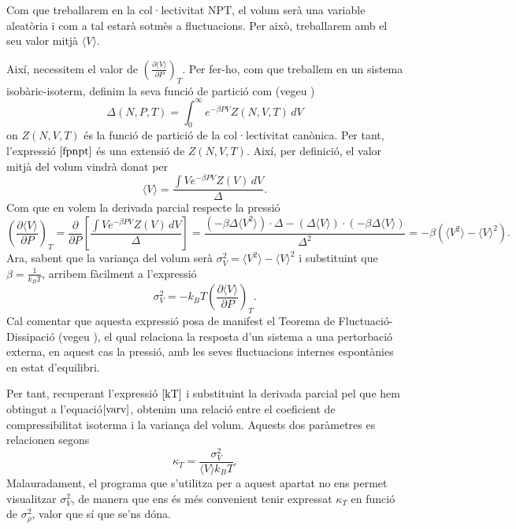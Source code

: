 \documentclass[a4paper,10.5pt]{report}
\begin{document}
Com que treballarem en la col·lectivitat NPT, el volum serà una variable aleatòria i com a tal estarà sotmès a fluctuacions. Per això, treballarem amb el seu valor mitjà $\langle V \rangle$.

Així, necessitem el valor de $\left( \frac{\partial \langle V \rangle}{\partial P} \right)_T$. Per fer-ho, com que treballem en un sistema isobàric-isoterm, definim la seva funció de partició com (vegeu \cite{col})
\begin{equation}
	\Delta(N, P, T) = \int_0^\infty e^{-\beta P V} Z(N, V, T) \, dV
	\label{fpnpt}
\end{equation}
on $Z(N,V,T)$ és la funció de partició de la col·lectivitat canònica. Per tant, l'expressió $\eqref{fpnpt}$ és una extensió de  $Z(N,V,T)$. Així, per definició, el valor mitjà del volum vindrà donat per
\begin{equation}
	\langle V \rangle = \frac{\int V e^{-\beta P V} Z(V) \, dV}{\Delta}.
	\label{vmigv}
\end{equation}
Com que en volem la derivada parcial respecte la pressió
\begin{equation}
	\left( \frac{\partial \langle V \rangle}{\partial P} \right)_T = \frac{\partial}{\partial P} \left[ \frac{\int V e^{-\beta PV} Z(V) \, dV}{\Delta} \right] = \frac{(-\beta \Delta \langle V^2 \rangle) \cdot \Delta - (\Delta \langle V \rangle) \cdot (-\beta \Delta \langle V \rangle)}{\Delta^2} = -\beta \left( \langle V^2 \rangle - \langle V \rangle^2 \right).
\end{equation}
Ara, sabent que la variança del volum serà $\sigma_V^2 = \langle V^2 \rangle - \langle V \rangle^2$ i substituint que $\beta = \frac{1}{k_B T}$, arribem fàcilment a l'expressió
\begin{equation}
	\sigma_V^2 = -k_B T \left( \frac{\partial \langle V \rangle}{\partial P} \right)_T.
	\label{varv}
\end{equation}
Cal comentar que aquesta expressió posa de manifest el Teorema de Fluctuació-Dissipació (vegeu \cite{teorema}), el qual relaciona la resposta d'un sistema a una pertorbació externa, en aquest cas la pressió, amb les seves fluctuacions internes espontànies en estat d'equilibri.

Per tant, recuperant l'expressió $\eqref{kT}$ i substituint la derivada parcial pel que hem obtingut a l'equació$\eqref{varv}$, obtenim una relació entre el coeficient de compressibilitat isoterma i la variança del volum. Aquests dos paràmetres es relacionen segons
\begin{equation}
	\kappa_T = \frac{\sigma_V^2}{\langle V \rangle k_B T}.
	\label{eq2.8}
\end{equation}
Malauradament, el programa que s'utilitza per a aquest apartat no ens permet visualitzar $\sigma_V^2$, de manera que ens és més convenient tenir expressat $\kappa_T$ en funció de $\sigma_{\rho}^2$, valor que sí que se'ns dóna.
\end{document}
